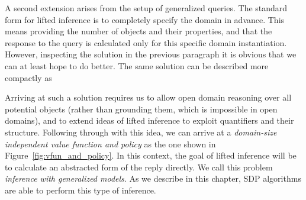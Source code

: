 %
A second extension arises from the setup of generalized
queries. The standard form for lifted inference is to completely
specify the domain in advance. This means providing the number of
objects and their properties, and that the response to the query is calculated
only for this specific domain instantiation.
%
%
%
%
%
%
However, inspecting the solution in the previous paragraph it is obvious that we can at least hope to do better. The same solution can be described more compactly as 
\begin{center}
\vspace{-4mm}
\end{center}
Arriving at such a solution requires us to 
allow open domain reasoning over all potential objects (rather than
grounding them, which is impossible in open domains), and to extend 
ideas of lifted inference to exploit quantifiers and their structure. 
Following through with this idea, we can 
%
%
%
%
arrive at a \emph{domain-size independent value function and policy}
as the one shown in Figure~\ref{fig:vfun_and_policy}.  
In this context, the goal of lifted inference will
be to calculate an abstracted form of the reply directly. 
We call this problem {\em inference with generalized models}.
As we describe in this chapter, SDP algorithms are able to perform this type of inference.

